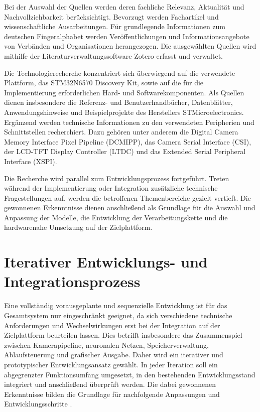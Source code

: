 Bei der Auswahl der Quellen werden deren fachliche Relevanz, Aktualität und Nachvollziehbarkeit berücksichtigt. Bevorzugt werden Fachartikel und wissenschaftliche Ausarbeitungen. Für grundlegende Informationen zum deutschen Fingeralphabet werden Veröffentlichungen und Informationsangebote von Verbänden und Organisationen herangezogen. Die ausgewählten Quellen wird mithilfe der Literaturverwaltungssoftware Zotero erfasst und verwaltet.

Die Technologierecherche konzentriert sich überwiegend auf die verwendete Plattform, das STM32N6570 Discovery Kit, sowie auf die für die Implementierung erforderlichen Hard- und Softwarekomponenten. Als Quellen dienen insbesondere die Referenz- und Benutzerhandbücher, Datenblätter, Anwendungshinweise und Beispielprojekte des Herstellers STMicroelectronics. Ergänzend werden technische Informationen zu den verwendeten Peripherien und Schnittstellen recherchiert. Dazu gehören unter anderem die Digital Camera Memory Interface Pixel Pipeline (DCMIPP), das Camera Serial Interface (CSI), der LCD-TFT Display Controller (LTDC) und das Extended Serial Peripheral Interface (XSPI).

Die Recherche wird parallel zum Entwicklungsprozess fortgeführt. Treten während der Implementierung oder Integration zusätzliche technische Fragestellungen auf, werden die betroffenen Themenbereiche gezielt vertieft. Die gewonnenen Erkenntnisse dienen anschließend als Grundlage für die Auswahl und Anpassung der Modelle, die Entwicklung der Verarbeitungskette und die hardwarenahe Umsetzung auf der Zielplattform.

\section{Iterativer Entwicklungs- und Integrationsprozess}\label{sec:iterativer-prozess}

Eine vollständig vorausgeplante und sequenzielle Entwicklung ist für das Gesamtsystem nur eingeschränkt geeignet, da sich verschiedene technische Anforderungen und Wechselwirkungen erst bei der Integration auf der Zielplattform beurteilen lassen. Dies betrifft insbesondere das Zusammenspiel zwischen Kamerapipeline, neuronalen Netzen, Speicherverwaltung, Ablaufsteuerung und grafischer Ausgabe. Daher wird ein iterativer und prototypischer Entwicklungsansatz gewählt. In jeder Iteration soll ein abgegrenzter Funktionsumfang umgesetzt, in den bestehenden Entwicklungsstand integriert und anschließend überprüft werden. Die dabei gewonnenen Erkenntnisse bilden die Grundlage für nachfolgende Anpassungen und Entwicklungsschritte \cite[S. 70]{lopezIterativePrototypingMethodology2018}.

